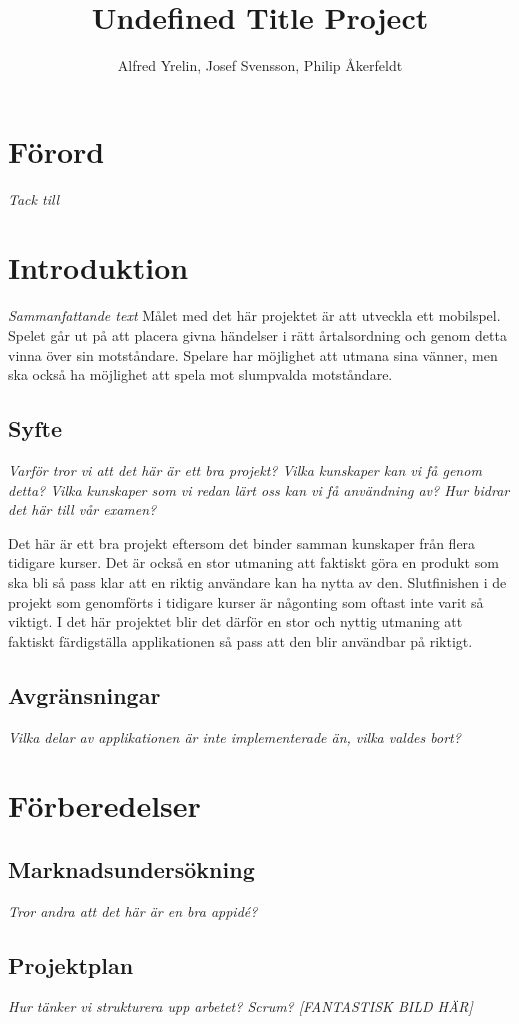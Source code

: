 \documentclass[12pt,a4paper]{article}
\author{Alfred Yrelin, Josef Svensson, Philip Åkerfeldt}
\title{Undefined Title Project}
\begin{document}
\maketitle

\section{Förord}
\textit{Tack till}
\tableofcontents
\section{Introduktion}
\textit{Sammanfattande text}
Målet med det här projektet är att utveckla ett mobilspel. Spelet går ut på att placera givna händelser i rätt årtalsordning och genom detta vinna över sin motståndare. Spelare har möjlighet att utmana sina vänner, men ska också ha möjlighet att spela mot slumpvalda motståndare. 
\subsection{Syfte}
\textit{Varför tror vi att det här är ett bra projekt?
Vilka kunskaper kan vi få genom detta?
Vilka kunskaper som vi redan lärt oss kan vi få användning av?
Hur bidrar det här till vår examen?}


Det här är ett bra projekt eftersom det binder samman kunskaper från flera tidigare kurser. Det är också en stor utmaning att faktiskt göra en produkt som ska bli så pass klar att en riktig användare kan ha nytta av den. Slutfinishen i de projekt som genomförts i tidigare kurser är någonting som oftast inte varit så viktigt. I det här projektet blir det därför en stor och nyttig utmaning att faktiskt färdigställa applikationen så pass att den blir användbar på riktigt. 
\subsection{Avgränsningar}
\textit{Vilka delar av applikationen är inte implementerade än, vilka valdes bort?}
\section{Förberedelser}
\subsection{Marknadsundersökning}
\textit{Tror andra att det här är en bra appidé?}
\subsection{Projektplan}
\textit{Hur tänker vi strukturera upp arbetet? Scrum?
[FANTASTISK BILD HÄR]}
\end{document}
